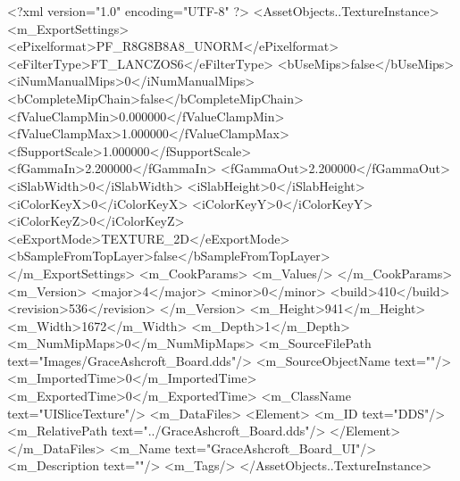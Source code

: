 <?xml version="1.0" encoding="UTF-8" ?>
<AssetObjects..TextureInstance>
	<m_ExportSettings>
		<ePixelformat>PF_R8G8B8A8_UNORM</ePixelformat>
		<eFilterType>FT_LANCZOS6</eFilterType>
		<bUseMips>false</bUseMips>
		<iNumManualMips>0</iNumManualMips>
		<bCompleteMipChain>false</bCompleteMipChain>
		<fValueClampMin>0.000000</fValueClampMin>
		<fValueClampMax>1.000000</fValueClampMax>
		<fSupportScale>1.000000</fSupportScale>
		<fGammaIn>2.200000</fGammaIn>
		<fGammaOut>2.200000</fGammaOut>
		<iSlabWidth>0</iSlabWidth>
		<iSlabHeight>0</iSlabHeight>
		<iColorKeyX>0</iColorKeyX>
		<iColorKeyY>0</iColorKeyY>
		<iColorKeyZ>0</iColorKeyZ>
		<eExportMode>TEXTURE_2D</eExportMode>
		<bSampleFromTopLayer>false</bSampleFromTopLayer>
	</m_ExportSettings>
	<m_CookParams>
		<m_Values/>
	</m_CookParams>
	<m_Version>
		<major>4</major>
		<minor>0</minor>
		<build>410</build>
		<revision>536</revision>
	</m_Version>
	<m_Height>941</m_Height>
	<m_Width>1672</m_Width>
	<m_Depth>1</m_Depth>
	<m_NumMipMaps>0</m_NumMipMaps>
	<m_SourceFilePath text="Images/GraceAshcroft_Board.dds"/>
	<m_SourceObjectName text=""/>
	<m_ImportedTime>0</m_ImportedTime>
	<m_ExportedTime>0</m_ExportedTime>
	<m_ClassName text="UISliceTexture"/>
	<m_DataFiles>
		<Element>
			<m_ID text="DDS"/>
			<m_RelativePath text="../GraceAshcroft_Board.dds"/>
		</Element>
	</m_DataFiles>
	<m_Name text="GraceAshcroft_Board_UI"/>
	<m_Description text=""/>
	<m_Tags/>
</AssetObjects..TextureInstance>
